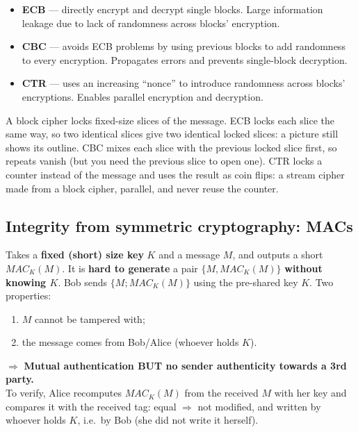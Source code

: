 \begin{keybox}[title=Modes of operation: summary]
\begin{itemize}
  \item \textbf{ECB} --- directly encrypt and decrypt single blocks. Large information
        leakage due to lack of randomness across blocks' encryption.
  \item \textbf{CBC} --- avoids ECB problems by using previous blocks to add randomness to
        every encryption. Propagates errors and prevents single-block decryption.
  \item \textbf{CTR} --- uses an increasing ``nonce'' to introduce randomness across
        blocks' encryptions. Enables parallel encryption and decryption.
\end{itemize}
\end{keybox}

\begin{goatbox}
A block cipher locks fixed-size slices of the message. ECB locks each slice the same way, so two
identical slices give two identical locked slices: a picture still shows its outline. CBC mixes
each slice with the previous locked slice first, so repeats vanish (but you need the previous
slice to open one). CTR locks a counter instead of the message and uses the result as coin flips:
a stream cipher made from a block cipher, parallel, and never reuse the counter.
\end{goatbox}

\subsection{Integrity from symmetric cryptography: MACs}

\begin{defnbox}[title=Message Authentication Code (MAC)]
Takes a \textbf{fixed (short) size key} $K$ and a message $M$, and outputs a short
$MAC_K(M)$. It is \textbf{hard to generate} a pair $\{M, MAC_K(M)\}$ \textbf{without
knowing $K$}. Bob sends $\{M; MAC_K(M)\}$ using the pre-shared key $K$. Two properties:
\begin{enumerate}
  \item $M$ cannot be tampered with;
  \item the message comes from Bob/Alice (whoever holds $K$).
\end{enumerate}
$\Rightarrow$ \textbf{Mutual authentication BUT no sender authenticity towards a 3rd
party.} \\
To verify, Alice recomputes $MAC_K(M)$ from the received $M$ with her key and compares it with
the received tag: equal $\Rightarrow$ not modified, and written by whoever holds $K$, i.e.\ by Bob
(she did not write it herself).
\end{defnbox}

